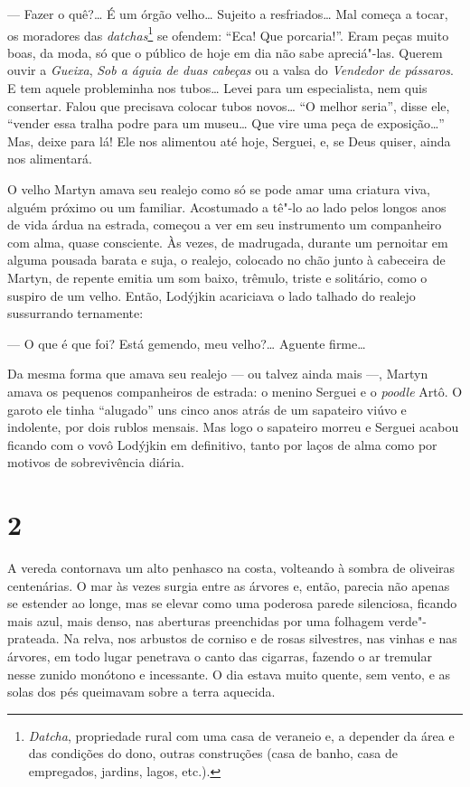 --- Fazer o quê?\ldots{} É um órgão velho\ldots{} Sujeito a resfriados\ldots{} Mal
começa a tocar, os moradores das \emph{datchas}\footnote{\emph{Datcha},
  propriedade rural com uma casa de veraneio e, a depender da área e das
  condições do dono, outras construções (casa de banho, casa de
  empregados, jardins, lagos, etc.).} se ofendem: ``Eca! Que
porcaria!''. Eram peças muito boas, da moda, só que o público de hoje em
dia não sabe apreciá"-las. Querem ouvir a \emph{Gueixa}, \emph{Sob a
águia de duas cabeças} ou a valsa do \emph{Vendedor de pássaros}. E tem
aquele probleminha nos tubos\ldots{} Levei para um especialista, nem quis
consertar. Falou que precisava colocar tubos novos\ldots{} ``O melhor seria'',
disse ele, ``vender essa tralha podre para um museu\ldots{} Que vire uma peça
de exposição\ldots{}'' Mas, deixe para lá! Ele nos alimentou até hoje,
Serguei, e, se Deus quiser, ainda nos alimentará.

O velho Martyn amava seu realejo como só se pode amar uma criatura viva,
alguém próximo ou um familiar. Acostumado a tê"-lo ao lado pelos longos
anos de vida árdua na estrada, começou a ver em seu instrumento um
companheiro com alma, quase consciente. Às vezes, de madrugada, durante
um pernoitar em alguma pousada barata e suja, o realejo, colocado no
chão junto à cabeceira de Martyn, de repente emitia um som baixo,
trêmulo, triste e solitário, como o suspiro de um velho. Então, Lodýjkin
acariciava o lado talhado do realejo sussurrando ternamente:

--- O que é que foi? Está gemendo, meu velho?\ldots{} Aguente firme\ldots{}

Da mesma forma que amava seu realejo --- ou talvez ainda mais ---,
Martyn amava os pequenos companheiros de estrada: o menino Serguei e o
\emph{poodle} Artô. O garoto ele tinha ``alugado'' uns cinco anos atrás
de um sapateiro viúvo e indolente, por dois rublos mensais. Mas logo o
sapateiro morreu e Serguei acabou ficando com o vovô Lodýjkin em
definitivo, tanto por laços de alma como por motivos de sobrevivência
diária.

\section{2}

A vereda contornava um alto penhasco na costa, volteando à sombra de
oliveiras centenárias. O mar às vezes surgia entre as árvores e, então,
parecia não apenas se estender ao longe, mas se elevar como uma poderosa
parede silenciosa, ficando mais azul, mais denso, nas aberturas
preenchidas por uma folhagem verde"-prateada. Na relva, nos arbustos de
corniso e de rosas silvestres, nas vinhas e nas árvores, em todo lugar
penetrava o canto das cigarras, fazendo o ar tremular nesse zunido
monótono e incessante. O dia estava muito quente, sem vento, e as solas
dos pés queimavam sobre a terra aquecida.

